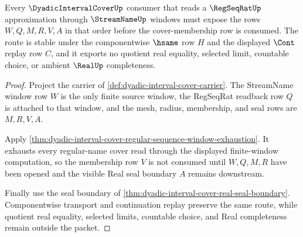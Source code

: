 \begin{theorem}
\label{thm:dyadic-interval-cover-regseqrat-streamname-coverage-route}
Every $\DyadicIntervalCoverUp$ consumer that reads a $\RegSeqRatUp$ approximation through $\StreamNameUp$ windows must expose the rows $W,Q,M,R,V,A$ in that order before the cover-membership row is consumed. The route is stable under the componentwise $\hsame$ row $H$ and the displayed $\Cont$ replay row $C$, and it exports no quotient real equality, selected limit, countable choice, or ambient $\RealUp$ completeness.
\end{theorem}
\begin{proof}
Project the carrier of \autoref{def:dyadic-interval-cover-carrier}. The StreamName window row $W$ is the only finite source window, the RegSeqRat readback row $Q$ is attached to that window, and the mesh, radius, membership, and seal rows are $M,R,V,A$.

Apply \autoref{thm:dyadic-interval-cover-regular-sequence-window-exhaustion}. It exhausts every regular-name cover read through the displayed finite-window computation, so the membership row $V$ is not consumed until $W,Q,M,R$ have been opened and the visible Real seal boundary $A$ remains downstream.

Finally use the seal boundary of \autoref{thm:dyadic-interval-cover-real-seal-boundary}. Componentwise transport and continuation replay preserve the same route, while quotient real equality, selected limits, countable choice, and Real completeness remain outside the packet.
\end{proof}

